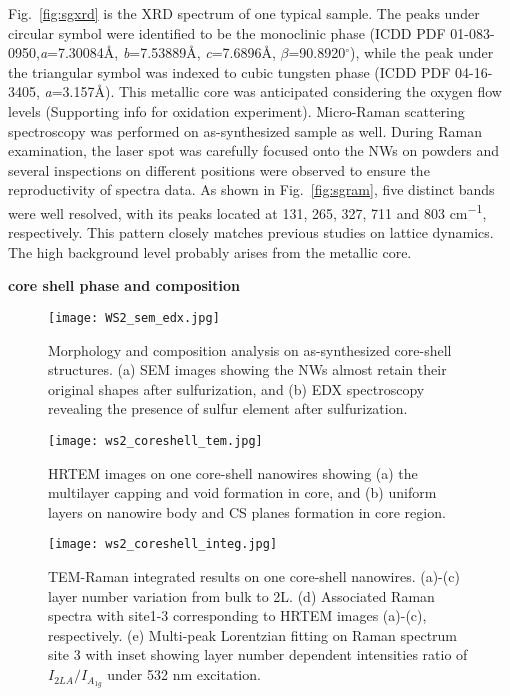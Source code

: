 \documentclass[11pt]{article} %
\begin{document}
Fig.~\ref{fig:sgxrd} is the XRD spectrum of one typical sample. The peaks under circular symbol were identified to be the monoclinic  phase (ICDD PDF 01-083-0950,\emph{a}=7.30084\AA, \emph{b}=7.53889\AA, \emph{c}=7.6896\AA, $\beta$=90.8920$^\circ$), while the peak under the triangular symbol was indexed to cubic tungsten phase (ICDD PDF 04-16-3405, \emph{a}=3.157\AA). This metallic core was anticipated considering the oxygen flow levels (Supporting info for oxidation experiment). Micro-Raman scattering spectroscopy was performed on as-synthesized sample as well. During Raman examination, the laser spot was carefully focused onto the NWs on powders and several inspections on different positions were observed to ensure the reproductivity of spectra data. As shown in Fig.~\ref{fig:sgram}, five distinct bands were well resolved, with its peaks located at 131, 265, 327, 711 and 803 \si{cm^{-1}}, respectively. This pattern closely matches previous studies on  lattice dynamics.\cite{Salje1975a,Dixit1986} The high background level probably arises from the metallic core.

\textbf{core shell phase and composition}

\begin{figure}[htb]
\centering
\texttt{[image: WS2\_sem\_edx.jpg]}
\caption{ Morphology and composition analysis on as-synthesized core-shell structures. (a) SEM images showing the NWs almost retain their original shapes after sulfurization, and (b) EDX spectroscopy revealing the presence of sulfur element after sulfurization.}
\label{fig:ws2sem}
\end{figure}

\begin{figure}[htb]
\centering
\texttt{[image: ws2\_coreshell\_tem.jpg]}
\caption{HRTEM images on one core-shell nanowires showing (a) the multilayer capping and void formation in  core, and (b) uniform  layers on nanowire body and CS planes formation in core region.}
\label{fig:ws2tem}
\end{figure}
\begin{figure}[htb]
\centering
\texttt{[image: ws2\_coreshell\_integ.jpg]}
\caption{TEM-Raman integrated results on one core-shell nanowires. (a)-(c)  layer number variation from bulk to 2L. (d) Associated Raman spectra with site1-3 corresponding to HRTEM images (a)-(c), respectively. (e) Multi-peak Lorentzian fitting on Raman spectrum site 3 with inset showing layer number dependent intensities ratio of $I_{2LA}/I_{A_{1g}}$ under 532 nm excitation.}
\label{fig:ws2ram}
\end{figure}
\end{document}
